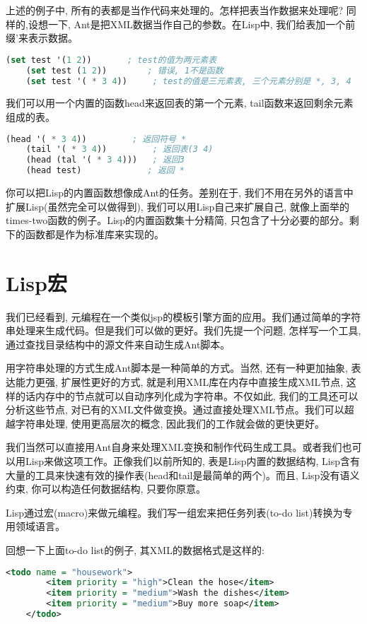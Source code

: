 \documentclass[10pt]{article}
\begin{document}
上述的例子中, 所有的表都是当作代码来处理的。怎样把表当作数据来处理呢? 同样的,设想一下, Ant是把XML数据当作自己的参数。在Lisp中, 我们给表加一个前缀'来表示数据。
\begin{lstlisting}[language=lisp]
    (set test '(1 2))       ; test的值为两元素表
    (set test (1 2))        ; 错误, 1不是函数
    (set test '( * 3 4))     ; test的值是三元素表, 三个元素分别是 *, 3, 4
\end{lstlisting}

我们可以用一个内置的函数head来返回表的第一个元素, tail函数来返回剩余元素组成的表。
\begin{lstlisting}[language=lisp]
    (head '( * 3 4))         ; 返回符号 *
    (tail '( * 3 4))         ; 返回表(3 4)
    (head (tal '( * 3 4)))   ; 返回3
    (head test)             ; 返回 *
\end{lstlisting}

你可以把Lisp的内置函数想像成Ant的任务。差别在于, 我们不用在另外的语言中扩展Lisp(虽然完全可以做得到), 我们可以用Lisp自己来扩展自己, 就像上面举的times-two函数的例子。Lisp的内置函数集十分精简, 只包含了十分必要的部分。剩下的函数都是作为标准库来实现的。
\section{Lisp宏}
\label{sec-8}

我们已经看到, 元编程在一个类似jsp的模板引擎方面的应用。我们通过简单的字符串处理来生成代码。但是我们可以做的更好。我们先提一个问题, 怎样写一个工具, 通过查找目录结构中的源文件来自动生成Ant脚本。

用字符串处理的方式生成Ant脚本是一种简单的方式。当然, 还有一种更加抽象, 表达能力更强, 扩展性更好的方式, 就是利用XML库在内存中直接生成XML节点, 这样的话内存中的节点就可以自动序列化成为字符串。不仅如此, 我们的工具还可以分析这些节点, 对已有的XML文件做变换。通过直接处理XML节点。我们可以超越字符串处理, 使用更高层次的概念, 因此我们的工作就会做的更快更好。

我们当然可以直接用Ant自身来处理XML变换和制作代码生成工具。或者我们也可以用Lisp来做这项工作。正像我们以前所知的, 表是Lisp内置的数据结构, Lisp含有大量的工具来快速有效的操作表(head和tail是最简单的两个)。而且, Lisp没有语义约束, 你可以构造任何数据结构, 只要你原意。

Lisp通过宏(macro)来做元编程。我们写一组宏来把任务列表(to-do list)转换为专用领域语言。

回想一下上面to-do list的例子, 其XML的数据格式是这样的:
\begin{lstlisting}[language=xml]
    <todo name = "housework">
        <item priority = "high">Clean the hose</item>
        <item priority = "medium">Wash the dishes</item>
        <item priority = "medium">Buy more soap</item>
    </todo>
\end{lstlisting}
\end{document}
